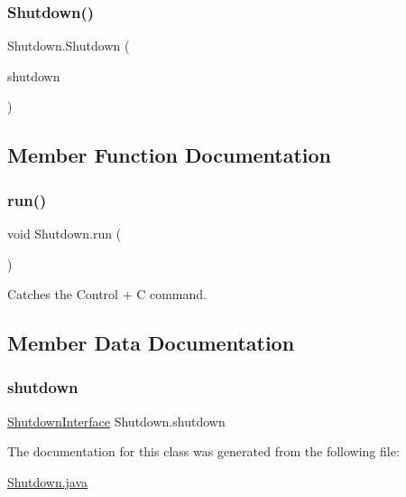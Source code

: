 \subsubsection{\texorpdfstring{Shutdown()}{Shutdown()}}
{\footnotesize\ttfamily Shutdown.\+Shutdown (\begin{DoxyParamCaption}\item[{\hyperlink{interface_shutdown_interface}{Shutdown\+Interface}}]{shutdown }\end{DoxyParamCaption})}



\subsection{Member Function Documentation}
\hypertarget{class_shutdown_a5044221edbe8af603a9874518074b38d}{}\label{class_shutdown_a5044221edbe8af603a9874518074b38d} 
\subsubsection{\texorpdfstring{run()}{run()}}
{\footnotesize\ttfamily void Shutdown.\+run (\begin{DoxyParamCaption}{ }\end{DoxyParamCaption})}



Catches the Control + C command. 



\subsection{Member Data Documentation}
\hypertarget{class_shutdown_a8ed6d4f262656f4f6b5e30b8da025e0a}{}\label{class_shutdown_a8ed6d4f262656f4f6b5e30b8da025e0a} 
\subsubsection{\texorpdfstring{shutdown}{shutdown}}
{\footnotesize\ttfamily \hyperlink{interface_shutdown_interface}{Shutdown\+Interface} Shutdown.\+shutdown}



The documentation for this class was generated from the following file\+:\begin{DoxyCompactItemize}
\item 
\hyperlink{_shutdown_8java}{Shutdown.\+java}\end{DoxyCompactItemize}
